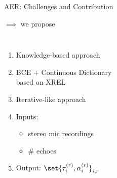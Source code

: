 \begin{frame}[t]{AER: Challenges and Contribution}






    \begin{alertblock}{$\implies$ we propose}

    \vspace*{.5em}
    \begin{columns}[T, onlytextwidth]
        \begin{enumerate}
            \item Knowledge-based approach
            \item BCE + Continuous Dictionary
            \\based on XREL
            \item Iterative-like approach
            \item Inputs:
            \begin{itemize}
                \item stereo mic recordings
                \item \# echoes
            \end{itemize}
            \item Output: $\set{\tau_i^{(r)}, \alpha_i^{(r)}}_{i,r}$
        \end{enumerate}


\end{columns}
\end{alertblock}
\end{frame}
